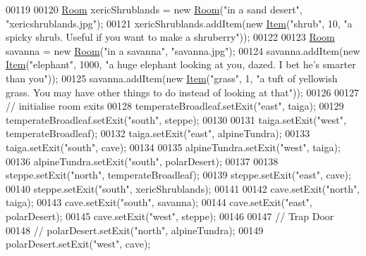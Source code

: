 \begin{DoxyCode}
00119 
00120         \hyperlink{classpkg__world_1_1Room}{Room} xericShrublands = \textcolor{keyword}{new} \hyperlink{classpkg__world_1_1Room}{Room}(\textcolor{stringliteral}{"in a sand desert"}, \textcolor{stringliteral}{"xericshrublands.jpg"});
00121         xericShrublands.addItem(\textcolor{keyword}{new} \hyperlink{classpkg__world_1_1Item}{Item}(\textcolor{stringliteral}{"shrub"}, 10, \textcolor{stringliteral}{"a spicky shrub. Useful if you want to make a
       shruberry"}));
00122 
00123         \hyperlink{classpkg__world_1_1Room}{Room} savanna = \textcolor{keyword}{new} \hyperlink{classpkg__world_1_1Room}{Room}(\textcolor{stringliteral}{"in a savanna"}, \textcolor{stringliteral}{"savanna.jpg"});
00124         savanna.addItem(\textcolor{keyword}{new} \hyperlink{classpkg__world_1_1Item}{Item}(\textcolor{stringliteral}{"elephant"}, 1000, \textcolor{stringliteral}{"a huge elephant looking at you, dazed. I bet he's
       smarter than you"}));
00125         savanna.addItem(\textcolor{keyword}{new} \hyperlink{classpkg__world_1_1Item}{Item}(\textcolor{stringliteral}{"grass"}, 1, \textcolor{stringliteral}{"a tuft of yellowish grass. You may have other things to
       do instead of looking at that"}));
00126 
00127         \textcolor{comment}{// initialise room exits}
00128         temperateBroadleaf.setExit(\textcolor{stringliteral}{"east"}, taiga);
00129         temperateBroadleaf.setExit(\textcolor{stringliteral}{"south"}, steppe);
00130 
00131         taiga.setExit(\textcolor{stringliteral}{"west"}, temperateBroadleaf);
00132         taiga.setExit(\textcolor{stringliteral}{"east"}, alpineTundra);
00133         taiga.setExit(\textcolor{stringliteral}{"south"}, cave);
00134 
00135         alpineTundra.setExit(\textcolor{stringliteral}{"west"}, taiga);
00136         alpineTundra.setExit(\textcolor{stringliteral}{"south"}, polarDesert);
00137 
00138         steppe.setExit(\textcolor{stringliteral}{"north"}, temperateBroadleaf);
00139         steppe.setExit(\textcolor{stringliteral}{"east"}, cave);
00140         steppe.setExit(\textcolor{stringliteral}{"south"}, xericShrublands);
00141 
00142         cave.setExit(\textcolor{stringliteral}{"north"}, taiga);
00143         cave.setExit(\textcolor{stringliteral}{"south"}, savanna);
00144         cave.setExit(\textcolor{stringliteral}{"east"}, polarDesert);
00145         cave.setExit(\textcolor{stringliteral}{"west"}, steppe);
00146 
00147         \textcolor{comment}{// Trap Door}
00148         \textcolor{comment}{// polarDesert.setExit("north", alpineTundra);}
00149         polarDesert.setExit(\textcolor{stringliteral}{"west"}, cave);

\end{DoxyCode}
